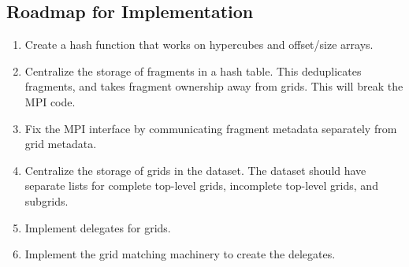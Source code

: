 \subsection{Roadmap for Implementation}

\begin{enumerate}
 \item Create a hash function that works on hypercubes and offset/size arrays.
 \item Centralize the storage of fragments in a hash table.
    This deduplicates fragments, and takes fragment ownership away from grids.
    This will break the MPI code.
 \item Fix the MPI interface by communicating fragment metadata separately from grid metadata.
 \item Centralize the storage of grids in the dataset.
    The dataset should have separate lists for complete top-level grids, incomplete top-level grids, and subgrids.
 \item Implement delegates for grids.
 \item Implement the grid matching machinery to create the delegates.
\end{enumerate}
 

